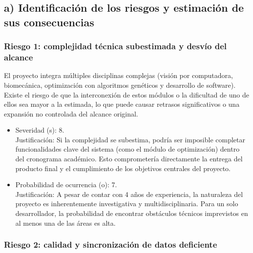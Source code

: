 \documentclass[
11pt, %
]{charter}
\begin{document}
\subsection*{a) Identificación de los riesgos y estimación de sus consecuencias}

\subsubsection*{Riesgo 1: complejidad técnica subestimada y desvío del alcance}

El proyecto integra múltiples disciplinas complejas (visión por computadora, biomecánica, optimización con algoritmos genéticos y desarrollo de software). Existe el riesgo de que la interconexión de estos módulos o la dificultad de uno de ellos sea mayor a la estimada, lo que puede causar retrasos significativos o una expansión no controlada del alcance original.
\begin{itemize}
  \item Severidad (s): 8.\\
  Justificación: Si la complejidad se subestima, podría ser imposible completar funcionalidades clave del sistema (como el módulo de optimización) dentro del cronograma académico. Esto comprometería directamente la entrega del producto final y el cumplimiento de los objetivos centrales del proyecto.
  \item Probabilidad de ocurrencia (o): 7.\\
  Justificación: A pesar de contar con 4 años de experiencia, la naturaleza del proyecto es inherentemente investigativa y multidisciplinaria. Para un solo desarrollador, la probabilidad de encontrar obstáculos técnicos imprevistos en al menos una de las áreas es alta.
\end{itemize}   

\subsubsection*{Riesgo 2: calidad y sincronización de datos deficiente}
\end{document}
